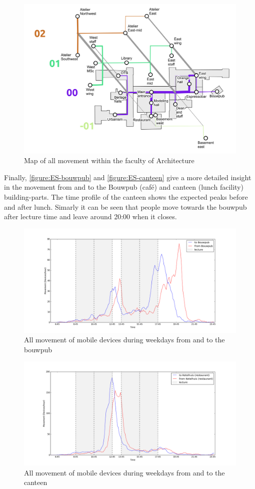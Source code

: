 \begin{figure}[H]
\centering
\includegraphics[scale=0.4]{bk_map_total.png}
\captionsetup{justification=centering}
\caption{Map of all movement within the faculty of Architecture}
\label{figure:ES-buildingpartAllMap}
\end{figure}

Finally, \autoref{figure:ES-bouwpub} and \autoref{figure:ES-canteen} give a more detailed insight in the movement from and to the Bouwpub (café) and canteen (lunch facility) building-parts. The time profile of the canteen shows the expected peaks before and after lunch. Simarly it can be seen that people move towards the bouwpub after lecture time and leave around 20:00 when it closes. 

\begin{figure}[H]
\centering
\includegraphics[scale=0.2]{buildingpart_fromTo_bouwpubGraph.png}
\captionsetup{justification=centering}
\caption{All movement of mobile devices during weekdays from and to the bouwpub}
\label{figure:ES-bouwpub}
\end{figure}

\begin{figure}[H]
\centering
\includegraphics[scale=0.2]{buildingpart_fromTo_canteenGraph.png}
\captionsetup{justification=centering}
\caption{All movement of mobile devices during weekdays from and to the canteen}
\label{figure:ES-canteen}
\end{figure}
